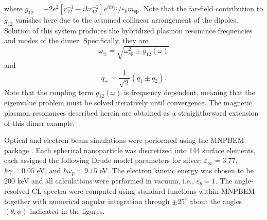 \documentclass [11pt, proquest] {uwthesis}[2016/11/22]
\begin{document}
where $g_{12}=-2e^2[r_{12}^{-3} - ikr_{12}^{-2}]e^{ikr_{12}}/\varepsilon_bm_{\textrm{sp}}.$ Note that the far-field contribution to $g_{12}$ vanishes here due to the assumed collinear arrangement of the dipoles. Solution of this system produces the hybridized plasmon resonance frequencies and modes of the dimer. Specifically, they are
\begin{equation}
\omega_{\pm} = \sqrt{\omega_{\textrm{sp}}^2 \pm g_{12}(\omega)}
\label{eigenvalues}
\end{equation}
and
\begin{equation}
q_{\pm} = \frac{1}{\sqrt{2}}\left(q_1 \pm q_2\right).
\label{eigenvectors}
\end{equation}
Note that the coupling term $g_{12}(\omega)$ is frequency dependent, meaning that the eigenvalue problem must be solved iteratively until convergence. The magnetic plasmon resonances described herein are obtained as a straightforward extension of this dimer example.




 Optical and electron beam simulations were performed using the MNPBEM package \cite{Hohenester2012,Hohenester2014}. Each spherical nanoparticle was discretized into 144 surface elements, each assigned the following Drude model parameters for silver: $\varepsilon_{\infty} = 3.77$, $\hbar\gamma = 0.05$ eV, and $\hbar\omega_{p} = 9.15$ eV. The electron kinetic energy was chosen to be 200 keV and all calculations were performed in vacuum, i.e., $\varepsilon_{b}=1.$ The angle-resolved CL spectra were computed using standard functions within MNPBEM together with numerical angular integration through $\pm25^\circ$ about the angles $(\theta,\phi)$ indicated in the figures.



\end{document}

